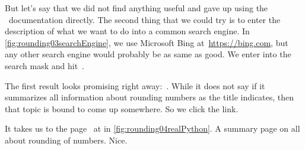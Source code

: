 %
But let's say that we did not find anything useful and gave up using the \python\ documentation directly.
The second thing that we could try is to enter the description of what we want to do into a common search engine.
In \cref{fig:rounding03searchEngine}, we use Microsoft Bing at~\url{https://bing.com}, but any other search engine would probably be as same as good.
We enter  into the search mask and hit~.

The first result looks promising right away:~.
While it does not say  if it summarizes all information about rounding numbers as the title indicates, then that topic is bound to come up somewhere.
So we click the link.

It takes us to the page~ at  in \cref{fig:rounding04realPython}.
A summary page on all about rounding of numbers.
Nice.

